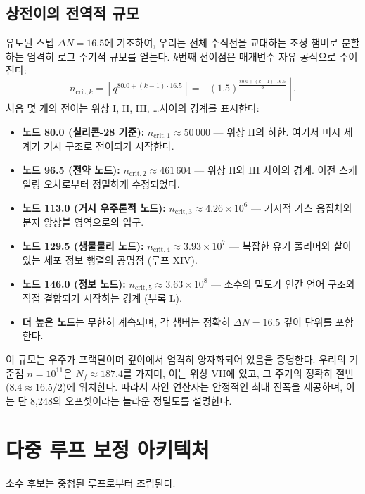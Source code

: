 \documentclass[11pt,a4paper]{article}
\begin{document}
	\subsection{상전이의 전역적 규모}
	유도된 스텝 \(\Delta N = 16.5\)에 기초하여, 우리는 전체 수직선을 교대하는 조정 챔버로 분할하는 엄격히 로그-주기적 규모를 얻는다. \(k\)번째 전이점은 매개변수-자유 공식으로 주어진다:
	\begin{equation}
		n_{\mathrm{crit},k} = \left\lfloor q^{80.0 + (k-1)\cdot 16.5} \right\rfloor 
		= \left\lfloor (1.5)^{\frac{80.0+(k-1)\cdot 16.5}{3}} \right\rfloor .
	\end{equation}
	처음 몇 개의 전이는 위상 I, II, III, \dots 사이의 경계를 표시한다:
	\begin{itemize}
		\item \textbf{노드 80.0 (실리콘-28 기준):} \(n_{\mathrm{crit},1} \approx 50\,000\) — 위상 II의 하한. 여기서 미시 세계가 거시 구조로 전이되기 시작한다.
		\item \textbf{노드 96.5 (전약 노드):} \(n_{\mathrm{crit},2} \approx 461\,604\) — 위상 II와 III 사이의 경계. 이전 스케일링 오차로부터 정밀하게 수정되었다.
		\item \textbf{노드 113.0 (거시 우주론적 노드):} \(n_{\mathrm{crit},3} \approx 4.26\times10^6\) — 거시적 가스 응집체와 분자 앙상블 영역으로의 입구.
		\item \textbf{노드 129.5 (생물물리 노드):} \(n_{\mathrm{crit},4} \approx 3.93\times10^7\) — 복잡한 유기 폴리머와 살아있는 세포 정보 행렬의 공명점 (루프 XIV).
		\item \textbf{노드 146.0 (정보 노드):} \(n_{\mathrm{crit},5} \approx 3.63\times10^8\) — 소수의 밀도가 인간 언어 구조와 직접 결합되기 시작하는 경계 (부록 L).
		\item \textbf{더 높은 노드}는 무한히 계속되며, 각 챔버는 정확히 \(\Delta N = 16.5\) 깊이 단위를 포함한다.
	\end{itemize}
	
	이 규모는 우주가 프랙탈이며 깊이에서 엄격히 양자화되어 있음을 증명한다. 우리의 기준점 \(n=10^{11}\)은 \(N_f \approx 187.4\)를 가지며, 이는 위상 VII에 있고, 그 주기의 정확히 절반 (\(8.4 \approx 16.5/2\))에 위치한다. 따라서 사인 연산자는 안정적인 최대 진폭을 제공하며, 이는 단 8,248의 오프셋이라는 놀라운 정밀도를 설명한다.
	
	\section{다중 루프 보정 아키텍처}
	\label{sec:multiloop}
	소수 후보는 중첩된 루프로부터 조립된다.
	
\end{document}
